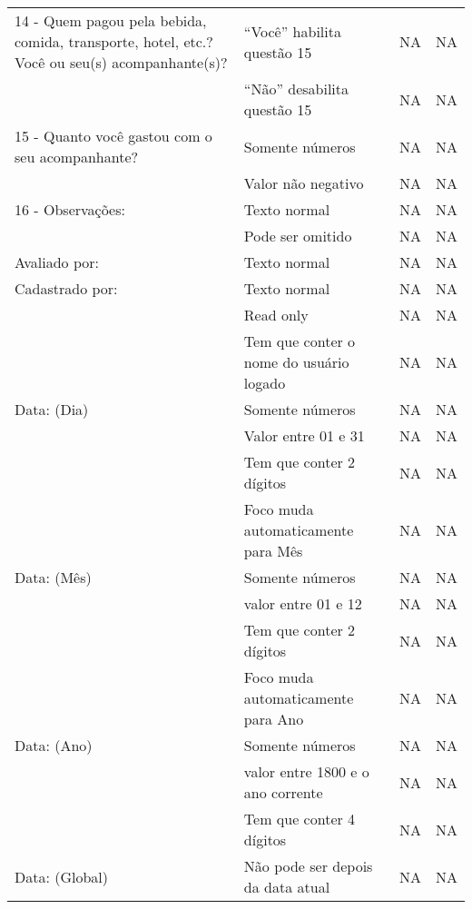 \begin{longtable}{|p{}|p{}|p{}|p{}|}
14 - Quem pagou pela bebida, comida, transporte, hotel, etc.? Você ou seu(s) acompanhante(s)? & ``Você'' habilita questão 15  & NA & NA \\ \cline{2-4} & ``Não'' desabilita questão 15 & NA & NA \\ \hline

15 - Quanto você gastou com o seu acompanhante? & Somente números & NA & NA \\ \cline{2-4} & Valor não negativo & NA & NA \\ \hline

16 - Observações: & Texto normal & NA & NA \\ \cline{2-4} & Pode ser omitido & NA & NA \\ \hline

Avaliado por: & Texto normal & NA & NA \\ \hline

Cadastrado por: & Texto normal & NA & NA \\ \cline{2-4} & Read only & NA & NA \\ \cline{2-4} & Tem que conter o nome do usuário logado & NA & NA \\ \hline

Data: (Dia) & Somente números & NA & NA \\ \cline{2-4} & Valor entre 01 e 31 & NA & NA \\ \cline{2-4} & Tem que conter 2 dígitos & NA & NA \\ \cline{2-4} & Foco muda automaticamente para Mês & NA & NA \\ \hline
Data: (Mês) & Somente números & NA & NA \\ \cline{2-4} & valor entre 01 e 12 & NA & NA \\ \cline{2-4} & Tem que conter 2 dígitos & NA & NA \\ \cline{2-4} & Foco muda automaticamente para Ano & NA & NA \\ \hline
Data: (Ano) & Somente números & NA & NA \\ \cline{2-4} & valor entre 1800 e o ano corrente & NA & NA \\ \cline{2-4} & Tem que conter 4 dígitos & NA & NA \\ \hline
Data: (Global) & Não pode ser depois da data atual & NA & NA \\ \hline

\end{longtable}
